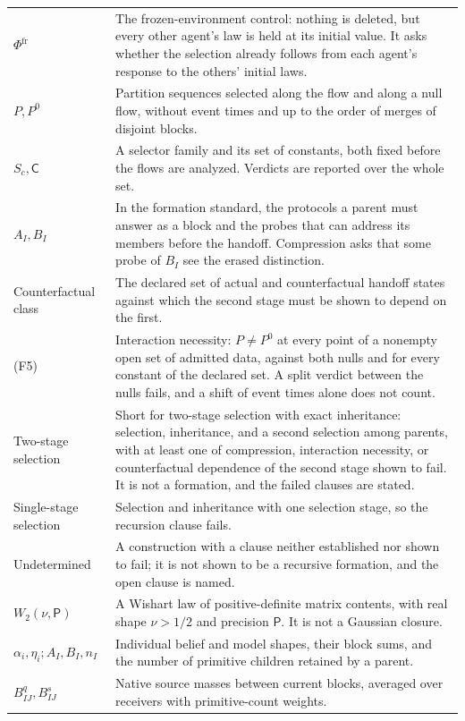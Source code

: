 \begin{longtable}{@{}>{\raggedright\arraybackslash}p{}>{\raggedright\arraybackslash}p{}@{}}
$\Phi^{\mathrm{fr}}$ & The frozen-environment control: nothing is deleted, but every other agent's law is held at its initial value. It asks whether the selection already follows from each agent's response to the others' initial laws.\\
$P,P^0$ & Partition sequences selected along the flow and along a null flow, without event times and up to the order of merges of disjoint blocks.\\
$S_c,\mathsf C$ & A selector family and its set of constants, both fixed before the flows are analyzed. Verdicts are reported over the whole set.\\
$A_I,B_I$ & In the formation standard, the protocols a parent must answer as a block and the probes that can address its members before the handoff. Compression asks that some probe of $B_I$ see the erased distinction.\\
Counterfactual class & The declared set of actual and counterfactual handoff states against which the second stage must be shown to depend on the first.\\
(F5) & Interaction necessity: $P\neq P^0$ at every point of a nonempty open set of admitted data, against both nulls and for every constant of the declared set. A split verdict between the nulls fails, and a shift of event times alone does not count.\\
Two-stage selection & Short for two-stage selection with exact inheritance: selection, inheritance, and a second selection among parents, with at least one of compression, interaction necessity, or counterfactual dependence of the second stage shown to fail. It is not a formation, and the failed clauses are stated.\\
Single-stage selection & Selection and inheritance with one selection stage, so the recursion clause fails.\\
Undetermined & A construction with a clause neither established nor shown to fail; it is not shown to be a recursive formation, and the open clause is named.\\
$W_2(\nu,\mathsf P)$ & A Wishart law of positive-definite matrix contents, with real shape $\nu>1/2$ and precision $\mathsf P$. It is not a Gaussian closure.\\
$\alpha_i,\eta_i; A_I,B_I,n_I$ & Individual belief and model shapes, their block sums, and the number of primitive children retained by a parent.\\
$B^q_{IJ},B^s_{IJ}$ & Native source masses between current blocks, averaged over receivers with primitive-count weights.\\

\end{longtable}
